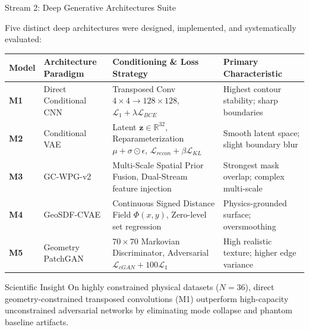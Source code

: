 \documentclass[aspectratio=169]{beamer}
\begin{document}
\begin{frame}{Stream 2: Deep Generative Architectures Suite}
	\begin{center}
		\small
		Five distinct deep architectures were designed, implemented, and systematically evaluated:
	\end{center}
	\vspace{-0.2cm}
	\begin{table}
		\centering
		\scriptsize
		\begin{tabular}{lp{3.2cm}p{4.2cm}p{3.2cm}}
			\toprule
			\textbf{Model} & \textbf{Architecture Paradigm} & \textbf{Conditioning \& Loss Strategy} & \textbf{Primary Characteristic} \\
			\midrule
			\textbf{M1} & Direct Conditional CNN & Transposed Conv $4\times 4 \to 128\times 128$, $\mathcal{L}_1 + \lambda \mathcal{L}_{BCE}$ & Highest contour stability; sharp boundaries \\
			\textbf{M2} & Conditional VAE & Latent $\mathbf{z} \in \mathbb{R}^{32}$, Reparameterization $\mu + \sigma \odot \epsilon$, $\mathcal{L}_{recon} + \beta \mathcal{L}_{KL}$ & Smooth latent space; slight boundary blur \\
			\textbf{M3} & GC-WPG-v2 & Multi-Scale Spatial Prior Fusion, Dual-Stream feature injection & Strongest mask overlap; complex multi-scale \\
			\textbf{M4} & GeoSDF-CVAE & Continuous Signed Distance Field $\Phi(x, y)$, Zero-level set regression & Physics-grounded surface; oversmoothing \\
			\textbf{M5} & Geometry PatchGAN & $70\times 70$ Markovian Discriminator, Adversarial $\mathcal{L}_{cGAN} + 100 \mathcal{L}_1$ & High realistic texture; higher edge variance \\
			\bottomrule
		\end{tabular}
	\end{table}
	\vspace{0.1cm}
	\begin{block}{Scientific Insight}
		On highly constrained physical datasets ($N=36$), direct geometry-constrained transposed convolutions (M1) outperform high-capacity unconstrained adversarial networks by eliminating mode collapse and phantom baseline artifacts.
	\end{block}
\end{frame}
\end{document}
